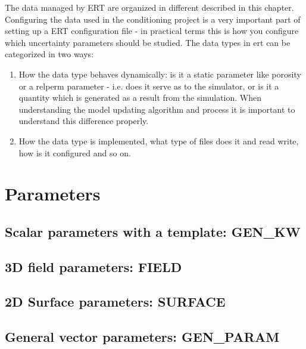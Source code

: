 \documentclass[letterpaper,10pt,english]{sphinxmanual}
\begin{document}
The data managed by ERT are organized in different  described in
this chapter. Configuring the data used in the conditioning project is a very
important part of setting up a ERT configuration file - in practical terms this
is how you configure which uncertainty parameters should be studied. The data
types in ert can be categorized in two ways:
\begin{enumerate}
\item {} 
How the data type behaves dynamically: is it a static parameter like porosity
or a relperm parameter - i.e. does it serve as  to the simulator, or
is it a quantity which is generated as a result from the simulation. When
understanding the model updating algorithm and process it is important to
understand this difference properly.

\item {} 
How the data type is implemented, what type of files does it and read write,
how is it configured and so on.

\end{enumerate}


\section{Parameters}
\label{\detokenize{data_types/index:parameters}}

\subsection{Scalar parameters with a template: GEN\_KW}
\label{\detokenize{data_types/index:scalar-parameters-with-a-template-gen-kw}}

\subsection{3D field parameters: FIELD}
\label{\detokenize{data_types/index:d-field-parameters-field}}

\subsection{2D Surface parameters: SURFACE}
\label{\detokenize{data_types/index:d-surface-parameters-surface}}

\subsection{General vector parameters: GEN\_PARAM}
\label{\detokenize{data_types/index:general-vector-parameters-gen-param}}
\end{document}
